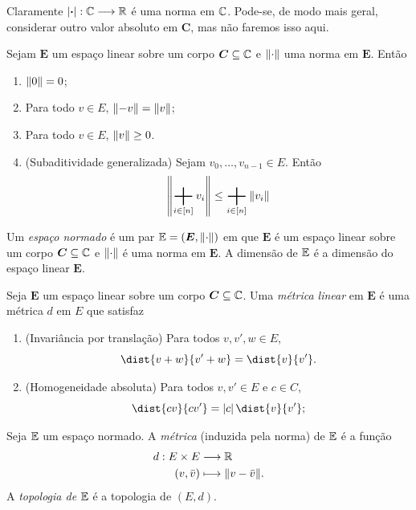 Claramente $\left\vert{\bm{\cdot}}\right\vert: \mathbb{C} \longrightarrow \mathbb{R}$ é uma norma em $\mathbb{C}$. Pode-se, de modo mais geral, considerar outro valor absoluto em $\bm C$, mas não faremos isso aqui.

\begin{prop}
Sejam $\bm E$ um espaço linear sobre um corpo $\bm C \subseteq \mathbb{C}$ e $\left\Vert{\cdot}\right\Vert$ uma norma em $\bm E$. Então
	\begin{enumerate}
	\item $\left\Vert{0}\right\Vert=0$;
	\item Para todo $v \in E$, $\left\Vert{-v}\right\Vert=\left\Vert{v}\right\Vert$;
	\item Para todo $v \in E$, $\left\Vert{v}\right\Vert \geq 0$.
	\item (Subaditividade generalizada) Sejam $v_0,\dots,v_{n-1} \in E$. Então
		\begin{equation*}
		\nor{\sum_{i \in [n]} v_i} \leq \sum_{i \in [n]} \nor{v_i}
		\end{equation*}
	\end{enumerate}
\end{prop}

\begin{defi}
Um \emph{espaço normado} é um par $\mathbb{E} = (\bm E,\left\Vert{\cdot}\right\Vert)$ em que $\bm E$ é um espaço linear sobre um corpo $\bm C \subseteq \mathbb{C}$ e $\left\Vert{\cdot}\right\Vert$ é uma norma em $\bm E$. A dimensão de $\mathbb{E}$ é a dimensão do espaço linear $\bm E$.
\end{defi}

\begin{defi}
Seja $\bm E$ um espaço linear sobre um corpo $\bm C \subseteq \mathbb{C}$. Uma \emph{métrica linear} em $\bm E$ é uma métrica $d$ em $E$ que satisfaz
	\begin{enumerate}
	\item (Invariância por translação) Para todos $v,v',w \in E$,
		\begin{equation*}
		\dist{v+w}{v'+w} = \dist{v}{v'}.
		\end{equation*}
	\item (Homogeneidade absoluta) Para todos $v,v' \in E$ e $c \in C$,
		\begin{equation*}
		\dist{cv}{cv'} = \abs{c}\dist{v}{v'};
		\end{equation*}
	\end{enumerate}
\end{defi}

\begin{defi}
Seja $\mathbb{E}$ um espaço normado. A \emph{métrica} (induzida pela norma) de $\mathbb{E}$ é a função
	\begin{align*}
	{d}: {E \times E} &\longrightarrow {\mathbb{R}} \\{(v,\bar v)} &\longmapsto {\left\Vert{v - \bar v}\right\Vert}.
	\end{align*}	
A \emph{topologia de $\mathbb{E}$} é a topologia de $(E,d)$.
\end{defi}

